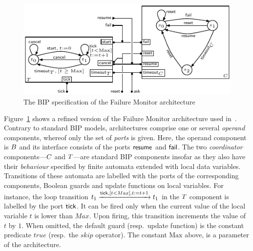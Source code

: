 \documentclass[smallcondensed]{svjour3}
\newcommand{\mdash}{---}
\newcommand{\resp}[1][\ ]{resp.#1}
\newcommand{\goesto}[2][]{\ensuremath{\xrightarrow[#1]{#2}}}
\newcommand{\true}{\ensuremath{\mathit{true}}}
\begin{document}
\begin{figure}[t]
  \centering
  \includegraphics[width=\columnwidth]{ActaXFIG/BIPspec-ArchFailureTimer-v2-2}
  \caption{The BIP specification of the Failure Monitor architecture}
  \label{schema:ArchFailure:BIP}
\end{figure}

Figure~\ref{schema:ArchFailure:BIP} shows a refined version of the
Failure Monitor architecture used in~\cite{CubETH-case-study}.
Contrary to standard BIP models, architectures comprise one or several
\emph{operand} components, whereof only the set of \emph{ports} is
given.  Here, the operand component is $B$ and its interface
consists of the ports $\mathsf{resume}$ and $\mathsf{fail}$.
The two \emph{coordinator} components\mdash $C$ and
$T$\mdash are standard BIP components insofar as they also
have their \emph{behaviour} specified by finite automata extended with
local data variables.  Transitions of these automata are labelled with
the ports of the corresponding components, Boolean guards and update
functions on local variables.  For instance, the loop transition
$t_1 \goesto{\PortTick, [t < Max], t:=t+1} t_1$
in the $T$ component is labelled by the port $\mathsf{tick}$. It
can be fired only when the current value of the local variable $t$ is
lower than $Max$.  Upon firing, this transition increments the value
of $t$ by $1$.  When omitted, the default guard (\resp update
function) is the constant predicate $\true$ (\resp the $\mathit{skip}$
operator).  The constant $\mathrm{Max}$ above, is a parameter of the
architecture.
\end{document}
